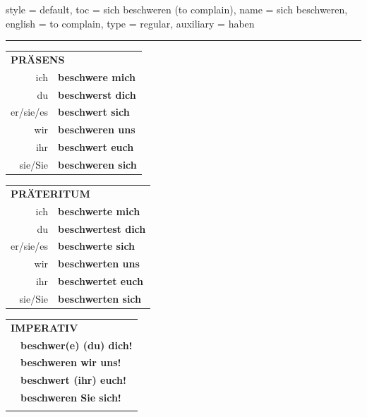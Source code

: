 \begin{verbentry}{
  style = {default},
  toc = {sich beschweren (to complain)},
  name = {sich beschweren},
  english = {to complain},
  type = {regular},
  auxiliary = {haben}
}
 
    
       \vspace{5pt}

    \hrule
    
    \vspace{5pt}

  \begin{tabular}{rl}
     \multicolumn{2}{l}{\textbf{PRÄSENS} }\\
    ich & \textbf{beschwere mich}\\
    du & \textbf{beschwerst dich}\\
    er/sie/es & \textbf{beschwert sich}\\
    wir & \textbf{beschweren uns}\\
    ihr & \textbf{beschwert euch}\\
    sie/Sie & \textbf{beschweren sich}\\
  \end{tabular}
  \hfill
     \begin{tabular}{rl}
    \multicolumn{2}{l}{\textbf{PRÄTERITUM} }\\
    ich & \textbf{beschwerte mich}\\
    du & \textbf{beschwertest dich}\\
    er/sie/es & \textbf{beschwerte sich}\\
    wir & \textbf{beschwerten uns}\\
    ihr & \textbf{beschwertet euch}\\
    sie/Sie & \textbf{beschwerten sich}\\
  \end{tabular}
  \hfill
  \begin{tabular}{rl}
     \multicolumn{2}{l}{\textbf{IMPERATIV} }\\
   & \textbf{beschwer(e) (du) dich!}\\
   & \textbf{beschweren wir uns!}\\
   & \textbf{beschwert (ihr) euch!}\\
   & \textbf{beschweren Sie sich!}\\
   & \vspace{10pt}
  \end{tabular}

    \vspace{10pt}


\end{verbentry}
